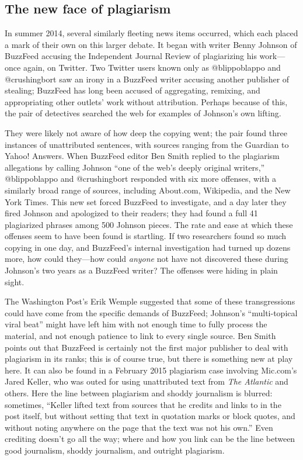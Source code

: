 \subsection{The new face of plagiarism}

In summer 2014, several similarly fleeting news items occurred, which each placed a mark of their own on this larger debate. It began with writer Benny Johnson of BuzzFeed accusing the Independent Journal Review of plagiarizing his work---once again, on Twitter.\autocite{johnson_repeat_2014} Two Twitter users known only as @blippoblappo and @crushingbort saw an irony in a BuzzFeed writer accusing another publisher of stealing; BuzzFeed has long been accused of aggregating, remixing, and appropriating other outlets' work without attribution.\autocites[See, e.g.,][]{manjoo_how_2012}{chen_remix_2012} Perhaps because of this, the pair of detectives searched the web for examples of Johnson's own lifting.

They were likely not aware of how deep the copying went; the pair found three instances of unattributed sentences, with sources ranging from the Guardian to Yahoo! Answers.\autocite{blippoblappo_3_2014} When BuzzFeed editor Ben Smith replied to the plagiarism allegations by calling Johnson ``one of the web's deeply original writers,'' @blippoblappo and @crushingbort responded with six more offenses, with a similarly broad range of sources, including About.com, Wikipedia, and the New York Times.\autocite{blippoblappo_more_2014} This new set forced BuzzFeed to investigate, and a day later they fired Johnson and apologized to their readers; they had found a full 41 plagiarized phrases among 500 Johnson pieces.\autocite{smith_editors_2014} The rate and ease at which these offenses seem to have been found is startling. If two researchers found so much copying in one day, and BuzzFeed's internal investigation had turned up dozens more, how could they---how could \emph{anyone} not have not discovered these during Johnson's two years as a BuzzFeed writer? The offenses were hiding in plain sight.

The Washington Post's Erik Wemple suggested that some of these transgressions could have come from the specific demands of BuzzFeed; Johnson's ``multi-topical viral beat'' might have left him with not enough time to fully process the material, and not enough patience to link to every single source.\autocite{wemple_ravages_2014} Ben Smith points out that BuzzFeed is certainly not the first major publisher to deal with plagiarism in its ranks; this is of course true, but there is something new at play here. It can also be found in a February 2015 plagiarism case involving Mic.com's Jared Keller, who was outed for using unattributed text from \emph{The Atlantic} and others. Here the line between plagiarism and shoddy journalism is blurred: sometimes, ``Keller lifted text from sources that he credits and links to in the post itself, but without setting that text in quotation marks or block quotes, and without noting anywhere on the page that the text was not his own.''\autocite{trotter_plagiarist_2015} Even crediting doesn't go all the way; where and how you link can be the line between good journalism, shoddy journalism, and outright plagiarism.

